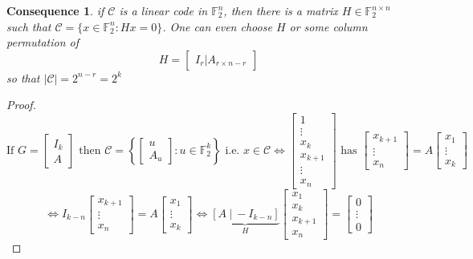\documentclass{article}
\newtheorem{consequence}{Consequence}[section]
\theoremstyle{definition} %
\def\F{\mathbb{F}}
\def\C{\mathscr{C}}
\begin{document}
\begin{consequence}
  if $\C$ is a linear code in $\F_2^n$, then there is a matrix $H \in \F_2^{n\times n}$ such that $\C = \{ x \in \F_2^n : H x = 0 \}$. One can even choose $H$ or some column permutation of
  \[
    H = \begin{bmatrix}
      I_r|A_{r \times n-r}
    \end{bmatrix}
  \]
  so that $|\C| = 2^{n-r} = 2^k$
\end{consequence}


\begin{proof}
  \[
    \text{If } G = \begin{bmatrix}
      I_k\\
      A
    \end{bmatrix} \text{ then } \C = \left\{ \begin{bmatrix}
      u\\ A_u
    \end{bmatrix} : u \in \F_2^k \right\}
    \text{ i.e. } x\in \C \iff \begin{bmatrix}
      1\\ \vdots\\x_k\\x_{k+1}\\ \vdots\\x_n
    \end{bmatrix} \text{ has } \begin{bmatrix}
      x_{k+1}\\ \vdots\\ x_n
    \end{bmatrix} = A \begin{bmatrix}
      x_{1}\\ \vdots\\ x_k
    \end{bmatrix}
  \]
  \[
    \iff I_{k-n} \begin{bmatrix}
      x_{k+1}\\ \vdots\\ x_n
    \end{bmatrix} = A \begin{bmatrix}
      x_{1}\\ \vdots\\ x_k
    \end{bmatrix}
    \iff
    \underbrace{[A~|~-I_{k-n}]}_{H}\begin{bmatrix}
      x_1\\x_k\\x_{k+1}\\x_n
    \end{bmatrix} =
    \begin{bmatrix}
      0\\ \vdots \\ 0
    \end{bmatrix}
  \]
\end{proof}
\end{document}
